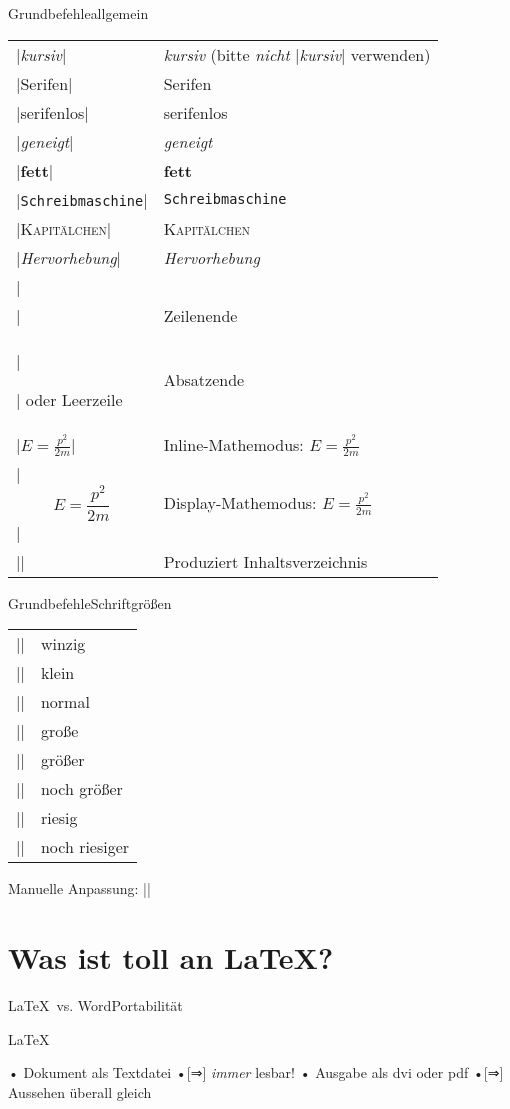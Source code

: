 \begin{frame}[c,fragile]{Grundbefehle}{allgemein}
\begin{tabular}{ll}
|\textit{kursiv}| & \textit{kursiv} (bitte \emph{nicht} |{\it kursiv}| verwenden)\\
|\textrm{Serifen}| & \textrm{Serifen}\\
|\textsf{serifenlos}| & \textsf{serifenlos}\\
|\textsl{geneigt}| & \textsl{geneigt}\\
|\textbf{fett}| & \textbf{fett}\\
|\texttt{Schreibmaschine}| & \texttt{Schreibmaschine}\\
|\textsc{Kapitälchen}| & \textsc{Kapitälchen}\\
|\emph{Hervorhebung}| & \emph{Hervorhebung}\\
|\\| & Zeilenende\\
|\par| oder Leerzeile & Absatzende\\
|$E = \frac{p^2}{2m}$| & Inline-Mathemodus: $E = \frac{p^2}{2m}$\\
|\[E = \frac{p^2}{2m}\]| & Display-Mathemodus: $\displaystyle E = \frac{p^2}{2m}$\\ %
|\tableofcontents| & Produziert Inhaltsverzeichnis
\end{tabular}
\end{frame}

\begin{frame}[c,fragile]{Grundbefehle}{Schriftgrößen}
\begin{block}{}
\begin{tabular}{ll}
|\tiny| & \tiny winzig \\
|\small| & \small klein \\
|\normalsize| & \normalsize normal\\
|\large| & \large große\\
|\Large| & \Large größer\\
|\LARGE| & \LARGE noch größer\\
|\huge| & \huge riesig\\
|\Huge| & \Huge noch riesiger\\
\end{tabular}
\end{block}
Manuelle Anpassung: |\fontsize{10}{12}\selectfont|
\end{frame}

\section[Warum LaTeX?]{Was ist toll an \LaTeX?}
\begin{frame}{\LaTeX\ vs. Word}{Portabilität}
\begin{block}{\strut\LaTeX}
• Dokument als Textdatei
•[⇒] \emph{immer} lesbar!
• Ausgabe als dvi oder pdf
•[⇒] Aussehen überall gleich
\•
\end{block}
\end{frame}

